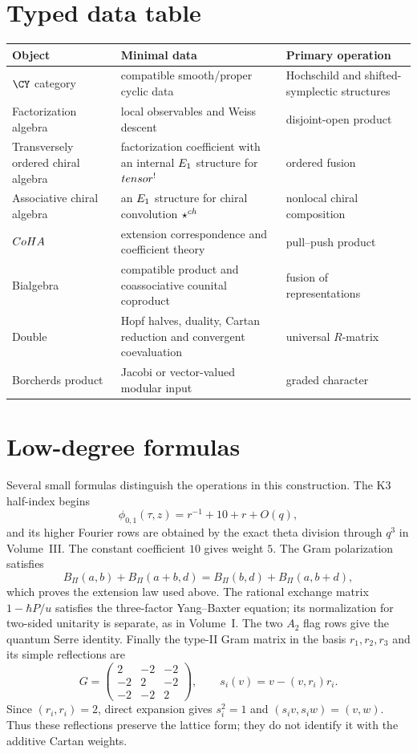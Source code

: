 \section{Typed data table}
\begin{center}
\small
\begin{tabularx}{0.98\textwidth}{@{}>{\raggedright\arraybackslash}p{}>{\raggedright\arraybackslash}X>{\raggedright\arraybackslash}p{}@{}}
\toprule
\textbf{Object}&\textbf{Minimal data}&\textbf{Primary operation}\\
\midrule
$\CY$ category&compatible smooth/proper cyclic data&Hochschild and shifted-symplectic structures\\
Factorization algebra&local observables and Weiss descent&disjoint-open product\\
Transversely ordered chiral algebra&factorization coefficient with an internal $E_1$ structure for $tensor^!$&ordered fusion\\
Associative chiral algebra&an $E_1$ structure for chiral convolution $\mathbin{\star^{ch}}$&nonlocal chiral composition\\
$CoHA$&extension correspondence and coefficient theory&pull--push product\\
Bialgebra&compatible product and coassociative counital coproduct&fusion of representations\\
Double&Hopf halves, duality, Cartan reduction and convergent coevaluation&universal $R$-matrix\\
Borcherds product&Jacobi or vector-valued modular input&graded character\\
\bottomrule
\end{tabularx}
\end{center}

\section{Low-degree formulas}
Several small formulas distinguish the operations in this construction.
The K3 half-index begins
\[
 \phi_{0,1}(\tau,z)=r^{-1}+10+r+O(q),
\]
and its higher Fourier rows are obtained by the exact theta division
through $q^3$ in Volume~III. The constant coefficient $10$ gives weight $5$.
The Gram polarization satisfies
\[
 B_\Pi(a,b)+B_\Pi(a+b,d)
 =B_\Pi(b,d)+B_\Pi(a,b+d),
\]
which proves the extension law used above. The rational exchange matrix
$1-\hbar P/u$ satisfies the three-factor Yang--Baxter equation; its
normalization for two-sided unitarity is separate, as in Volume~I.
The two $A_2$ flag rows give the quantum Serre identity. Finally the
type-II Gram matrix in the basis $r_1,r_2,r_3$ and its simple reflections are
\[
 G=\begin{pmatrix}2&-2&-2\\-2&2&-2\\-2&-2&2\end{pmatrix},
 \qquad s_i(v)=v-(v,r_i)r_i.
\]
Since $(r_i,r_i)=2$, direct expansion gives $s_i^2=1$ and
$(s_i v,s_i w)=(v,w)$. Thus these reflections preserve the lattice
form; they do not identify it with the additive Cartan weights.


